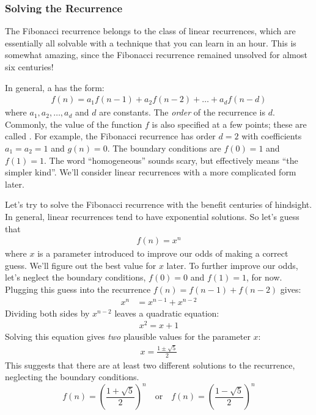 \subsubsection{Solving the Recurrence}

The Fibonacci recurrence belongs to the class of linear recurrences,
which are essentially all solvable with a technique that you can learn
in an hour.  This is somewhat amazing, since the Fibonacci recurrence
remained unsolved for almost six centuries!

In general, a  has the form:
\begin{align*}
f(n) = a_1 f(n-1) + a_2 f(n-2) + \ldots + a_d f(n - d)
\end{align*}
where $a_1, a_2, \ldots, a_d$ and $d$ are constants. The \emph{order}
 of the recurrence is $d$.  Commonly, the
value of the function $f$ is also specified at a few points; these are
called .  For example, the Fibonacci
recurrence has order $d = 2$ with coefficients $a_1 = a_2 = 1$ and
$g(n) = 0$.  The boundary conditions are $f(0) = 1$ and $f(1) = 1$.
The word ``homogeneous'' sounds scary, but effectively means ``the
simpler kind''.  We'll consider linear recurrences with a more
complicated form later.

Let's try to solve the Fibonacci recurrence with the benefit centuries
of hindsight.  In general, linear recurrences tend to have exponential
solutions.  So let's guess that
\begin{align*}
  f(n) = x^n
\end{align*}
where $x$ is a parameter introduced to improve our odds of making a
correct guess.  We'll figure out the best value for $x$ later. To
further improve our odds, let's neglect the boundary conditions, $f(0)
= 0$ and $f(1) = 1$, for now.  Plugging this guess into the recurrence
$f(n) = f(n - 1) + f(n - 2)$ gives:
\begin{align*}
x^n & = x^{n-1} + x^{n-2}
\end{align*}
Dividing both sides by $x^{n-2}$ leaves a quadratic equation:
\begin{align*}
x^2 = x + 1
\end{align*}
Solving this equation gives \emph{two} plausible values for the
parameter $x$:
\begin{align*}
x = \frac{1 \pm \sqrt{5}}{2}
\end{align*}
This suggests that there are at least two different solutions to the
recurrence, neglecting the boundary conditions.
\begin{equation*}
  f(n) = \left(\frac{1 + \sqrt{5}}{2}\right)^n\quad\text{or}\quad f(n) = \left(\frac{1 - \sqrt{5}}{2}\right)^n
\end{equation*}


